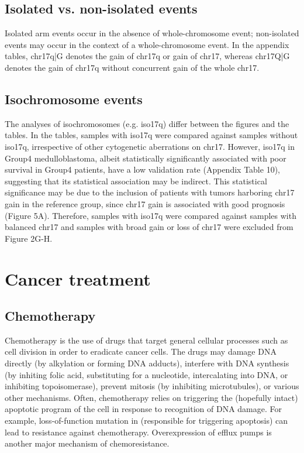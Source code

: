 \subsection{Isolated vs. non-isolated events}

Isolated arm events occur in the absence of whole-chromosome event; non-isolated events may occur in the context of a whole-chromosome event. In the appendix tables, chr17q|G denotes the gain of chr17q or gain of chr17, whereas chr17Q|G denotes the gain of chr17q without concurrent gain of the whole chr17.

\subsection{Isochromosome events}

The analyses of isochromosomes (e.g. iso17q) differ between the figures and the tables. In the tables, samples with iso17q were compared against samples without iso17q, irrespective of other cytogenetic aberrations on chr17. However, iso17q in Group4 medulloblastoma, albeit statistically significantly associated with poor survival in Group4 patients, have a low validation rate (Appendix Table 10), suggesting that its statistical association may be indirect. This statistical significance may be due to the inclusion of patients with tumors harboring chr17 gain in the reference group, since chr17 gain is associated with good prognosis (Figure 5A). Therefore, samples with iso17q were compared against samples with balanced chr17 and samples with broad gain or loss of chr17 were excluded from Figure 2G-H.


\section{Cancer treatment}

\subsection{Chemotherapy}

Chemotherapy is the use of drugs that target general cellular processes such as cell division in order to eradicate cancer cells. The drugs may damage DNA directly (by alkylation or forming DNA adducts), interfere with DNA synthesis (by inhiting folic acid, substituting for a nucleotide, intercalating into DNA, or inhibiting topoisomerase), prevent mitosis (by inhibiting microtubules), or various other mechanisms. Often, chemotherapy relies on triggering the (hopefully intact) apoptotic program of the cell in response to recognition of DNA damage. For example, loss-of-function mutation in  (responsible for triggering apoptosis) can lead to resistance against chemotherapy. Overexpression of efflux pumps is another major mechanism of chemoresistance.


